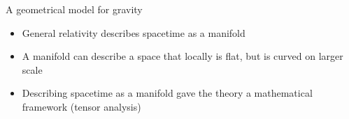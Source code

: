 \documentclass{beamer}
\begin{document}
\begin{frame}{A geometrical model for gravity}
\begin{itemize}
\item{General relativity describes spacetime as a manifold}
\item{A manifold can describe a space that locally is flat, but is curved on larger scale}
\item<4->{Describing spacetime as a manifold gave the theory a  mathematical framework (tensor analysis)}
\end{itemize}
\end{frame}
  
\end{document}
